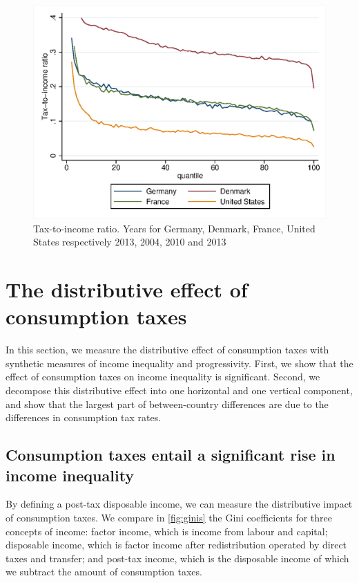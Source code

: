 \documentclass[12pt]{article}
\begin{document}
\begin{figure}[hp]
\centering
\includegraphics[height=0.42\textheight]{"images/19-02 de-dk-fr-us effort rates"}
\caption{Tax-to-income ratio. Years for Germany, Denmark, France, United States respectively 2013, 2004, 2010 and 2013}
\label{fig:effort_rate}  
\end{figure}

\section{The distributive effect of consumption taxes}
In this section, we measure the distributive effect of consumption taxes with synthetic measures of income inequality and progressivity. First, we show that the effect of consumption taxes on income inequality is significant. Second, we decompose this distributive effect into one horizontal and one vertical component, and show that the largest part of between-country differences are due to the differences in consumption tax rates.

\subsection{Consumption taxes entail a significant rise in income inequality}
By defining a post-tax disposable income, we can measure the distributive impact of consumption taxes. We compare in \cref{fig:ginis} the Gini coefficients for three concepts of income: factor income, which is income from labour and capital; disposable income, which is factor income after redistribution operated by direct taxes and transfer; and post-tax income, which is the disposable income of which we subtract the amount of consumption taxes.
\end{document}
